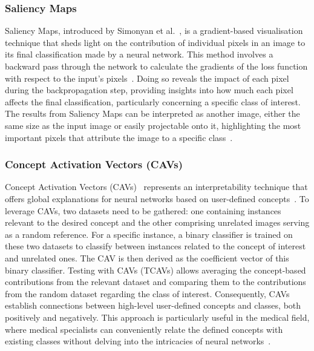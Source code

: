 \documentclass[dvipsnames]{article}
\renewcommand{\cite}[1]{\autocite{#1}}
\begin{document}
\subsubsection{Saliency Maps}

Saliency Maps, introduced by Simonyan et al.~\cite{simonyan2013deep}, is a gradient-based visualisation technique that sheds light on the contribution of individual pixels in an image to its final classification made by a neural network. This method involves a backward pass through the network to calculate the gradients of the loss function with respect to the input's pixels~\cite{molnar2020interpretable}. Doing so reveals the impact of each pixel during the backpropagation step, providing insights into how much each pixel affects the final classification, particularly concerning a specific class of interest. The results from Saliency Maps can be interpreted as another image, either the same size as the input image or easily projectable onto it, highlighting the most important pixels that attribute the image to a specific class~\cite{simonyan2013deep}.



\subsubsection{Concept Activation Vectors (CAVs)}

Concept Activation Vectors (CAVs)~\cite{kim2017interpretability} represents an interpretability technique that offers global explanations for neural networks based on user-defined concepts~\cite{molnar2020interpretable}. To leverage CAVs, two datasets need to be gathered: one containing instances relevant to the desired concept and the other comprising unrelated images serving as a random reference. For a specific instance, a binary classifier is trained on these two datasets to classify between instances related to the concept of interest and unrelated ones. The CAV is then derived as the coefficient vector of this binary classifier. Testing with CAVs (TCAVs) allows averaging the concept-based contributions from the relevant dataset and comparing them to the contributions from the random dataset regarding the class of interest. Consequently, CAVs establish connections between high-level user-defined concepts and classes, both positively and negatively. This approach is particularly useful in the medical field, where medical specialists can conveniently relate the defined concepts with existing classes without delving into the intricacies of neural networks~\cite{kim2017interpretability}.
\end{document}
